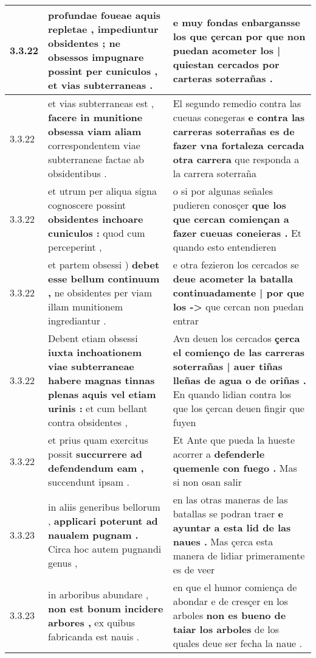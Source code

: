 \begin{tabular}{|p{1cm}|p{6.5cm}|p{6.5cm}|}
3.3.22 & profundae foueae aquis repletae , impediuntur obsidentes ; \textbf{ ne obsessos impugnare possint per cuniculos , } et vias subterraneas . & e muy fondas enbargansse los que çercan \textbf{ por que non puedan acometer los | quiestan cercados } por carteras soterrañas . \\\hline
3.3.22 & et vias subterraneas est , \textbf{ facere in munitione obsessa viam aliam } correspondentem viae subterraneae factae ab obsidentibus . & El segundo remedio contra las cueuas conegeras \textbf{ e contra las carreras soterrañas es de fazer vna fortaleza cercada otra carrera } que responda a la carrera soterraña \\\hline
3.3.22 & et utrum per aliqua signa cognoscere possint \textbf{ obsidentes inchoare cuniculos : } quod cum perceperint , & o si por algunas señales pudieren conosçer \textbf{ que los que cercan comiençan a fazer cueuas coneieras . } Et quando esto entendieren \\\hline
3.3.22 & et partem obsessi ) \textbf{ debet esse bellum continuum , } ne obsidentes per viam illam munitionem ingrediantur . & e otra fezieron los cercados se \textbf{ deue acometer la batalla continuadamente | por que los -\-> } que cercan non puedan entrar \\\hline
3.3.22 & Debent etiam obsessi \textbf{ iuxta inchoationem viae subterraneae habere magnas tinnas plenas aquis vel etiam urinis : } et cum bellant contra obsidentes , & Avn deuen los cercados \textbf{ çerca el comienço de las carreras soterrañas | auer tiñas lleñas de agua o de oriñas . } En quando lidian contra los que los çercan deuen fingir que fuyen \\\hline
3.3.22 & et prius quam exercitus possit \textbf{ succurrere ad defendendum eam , } succendunt ipsam . & Et Ante que pueda la hueste acorrer a \textbf{ defenderle quemenle con fuego . } Mas si non osan salir \\\hline
3.3.23 & in aliis generibus bellorum , \textbf{ applicari poterunt ad naualem pugnam . } Circa hoc autem pugnandi genus , & en las otras maneras de las batallas se podran traer \textbf{ e ayuntar a esta lid de las naues . } Mas çerca esta manera de lidiar primeramente es de veer \\\hline
3.3.23 & in arboribus abundare , \textbf{ non est bonum incidere arbores , } ex quibus fabricanda est nauis . & en que el humor comiença de abondar e de cresçer en los arboles \textbf{ non es bueno de taiar los arboles } de los quales deue ser fecha la naue . \\\hline

\end{tabular}

